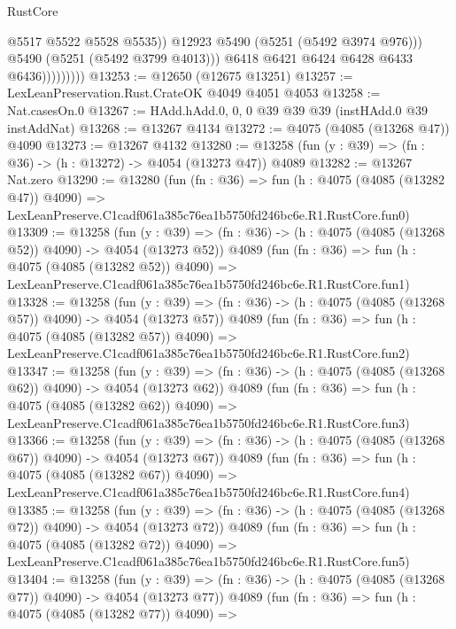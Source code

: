 \begin{lexlean}{RustCore}
\begin{coremodule}
                              @5517
                              @5522
                              @5528
                              @5535))
                          @12923
                          @5490
                          (@5251 (@5492 @3974 @976)))
                        @5490
                        (@5251 (@5492 @3799 @4013)))
                      @6418
                      @6421
                      @6424
                      @6428
                      @6433
                      @6436)))))))))
@13253 := @12650 (@12675 @13251)
@13257 := LexLeanPreservation.Rust.CrateOK @4049 @4051 @4053
@13258 := Nat.casesOn.{0}
@13267 := HAdd.hAdd.{0, 0, 0} @39 @39 @39 (instHAdd.{0} @39 instAddNat)
@13268 := @13267 @4134
@13272 := @4075 (@4085 (@13268 @47)) @4090
@13273 := @13267 @4132
@13280 := @13258 (fun (y : @39) => (fn : @36) -> (h : @13272) -> @4054 (@13273 @47)) @4089
@13282 := @13267 Nat.zero
@13290 := @13280
    (fun (fn : @36) =>
    fun (h : @4075 (@4085 (@13282 @47)) @4090) =>
    LexLeanPreserve.C1cadf061a385c76ea1b5750fd246bc6e.R1.RustCore.fun0)
@13309 := @13258
    (fun (y : @39) => (fn : @36) -> (h : @4075 (@4085 (@13268 @52)) @4090) -> @4054 (@13273 @52))
    @4089
    (fun (fn : @36) =>
    fun (h : @4075 (@4085 (@13282 @52)) @4090) =>
    LexLeanPreserve.C1cadf061a385c76ea1b5750fd246bc6e.R1.RustCore.fun1)
@13328 := @13258
    (fun (y : @39) => (fn : @36) -> (h : @4075 (@4085 (@13268 @57)) @4090) -> @4054 (@13273 @57))
    @4089
    (fun (fn : @36) =>
    fun (h : @4075 (@4085 (@13282 @57)) @4090) =>
    LexLeanPreserve.C1cadf061a385c76ea1b5750fd246bc6e.R1.RustCore.fun2)
@13347 := @13258
    (fun (y : @39) => (fn : @36) -> (h : @4075 (@4085 (@13268 @62)) @4090) -> @4054 (@13273 @62))
    @4089
    (fun (fn : @36) =>
    fun (h : @4075 (@4085 (@13282 @62)) @4090) =>
    LexLeanPreserve.C1cadf061a385c76ea1b5750fd246bc6e.R1.RustCore.fun3)
@13366 := @13258
    (fun (y : @39) => (fn : @36) -> (h : @4075 (@4085 (@13268 @67)) @4090) -> @4054 (@13273 @67))
    @4089
    (fun (fn : @36) =>
    fun (h : @4075 (@4085 (@13282 @67)) @4090) =>
    LexLeanPreserve.C1cadf061a385c76ea1b5750fd246bc6e.R1.RustCore.fun4)
@13385 := @13258
    (fun (y : @39) => (fn : @36) -> (h : @4075 (@4085 (@13268 @72)) @4090) -> @4054 (@13273 @72))
    @4089
    (fun (fn : @36) =>
    fun (h : @4075 (@4085 (@13282 @72)) @4090) =>
    LexLeanPreserve.C1cadf061a385c76ea1b5750fd246bc6e.R1.RustCore.fun5)
@13404 := @13258
    (fun (y : @39) => (fn : @36) -> (h : @4075 (@4085 (@13268 @77)) @4090) -> @4054 (@13273 @77))
    @4089
    (fun (fn : @36) =>
    fun (h : @4075 (@4085 (@13282 @77)) @4090) =>

\end{coremodule}
\end{lexlean}
